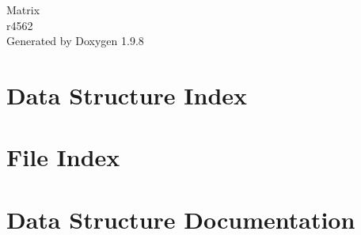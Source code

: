 \documentclass[twoside]{book}
\newcommand{\+}{\discretionary{\mbox{\scriptsize$\hookleftarrow$}}{}{}}
\newcommand{\clearemptydoublepage}{%
    \newpage{\pagestyle{empty}\cleardoublepage}%
  }
\begin{document}
  \raggedbottom
    \hypersetup{pageanchor=false,
                bookmarksnumbered=true,
                pdfencoding=unicode
               }
  \begin{titlepage}
  \vspace*{7cm}
  \begin{center}%
  {\Large Matrix}\\
  [1ex]\large r4562 \\
  \vspace*{1cm}
  {\large Generated by Doxygen 1.9.8}\\
  \end{center}
  \end{titlepage}
  \clearemptydoublepage
  \tableofcontents
  \clearemptydoublepage
  \hypersetup{pageanchor=true}
\chapter{Data Structure Index}

\chapter{File Index}

\chapter{Data Structure Documentation}




\end{document}
